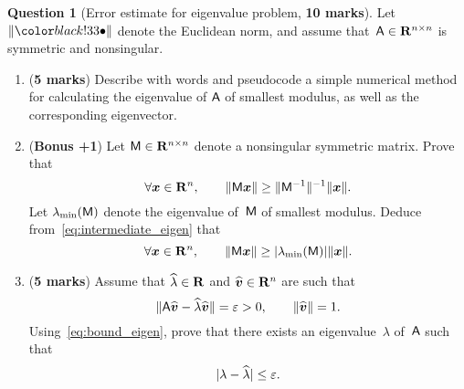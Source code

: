 \documentclass[11pt]{article}
\theoremstyle{definition}
\newtheorem{question}{Question}
\begin{document}


\newpage
\begin{question}
    [Error estimate for eigenvalue problem, \textbf{10 marks}]
    Let $\norm{\placeholder}$ denote the Euclidean norm,
    and assume that~$\mathsf A \in \mathbf R^{n \times n}$ is symmetric and nonsingular.

    \begin{enumerate}
        \item
            (\textbf{5 marks})
            Describe with words and pseudocode a simple numerical method for calculating the eigenvalue of $\mathsf A$ of smallest modulus,
            as well as the corresponding eigenvector.

        \item
            (\textbf{Bonus +1})
            Let $\mathsf M \in \mathbf R^{n \times n}$ denote a nonsingular symmetric matrix.
            Prove that
            \begin{equation}
                \label{eq:intermediate_eigen}
                \forall \mathbf{\boldsymbol{x}} \in \mathbf R^n, \qquad
                \lVert\mathsf M \mathbf{\boldsymbol{x}}\rVert \geq \lVert\mathsf M^{-1}\rVert^{-1} \lVert\mathbf{\boldsymbol{x}}\rVert.
            \end{equation}
            Let $\lambda_{\min}(\mathsf M)$ denote the eigenvalue of~$\mathsf M$ of smallest modulus.
            Deduce from~\eqref{eq:intermediate_eigen} that
            \begin{equation}
                \label{eq:bound_eigen}
                \forall \mathbf{\boldsymbol{x}} \in \mathbf R^n, \qquad
                \lVert\mathsf M \mathbf{\boldsymbol{x}}\rVert \geq \lvert\lambda_{\min}(\mathsf M)\rvert \lVert\mathbf{\boldsymbol{x}}\rVert.
            \end{equation}

        \item
            (\textbf{5 marks})
            Assume that $\widehat \lambda \in \mathbf R$ and $\widehat{\mathbf{\boldsymbol{v}}} \in \mathbf R^n$ are such that
            \begin{equation}
                \label{eq:bound}
                \lVert\mathsf A \widehat{\mathbf{\boldsymbol{v}}} - \widehat{\lambda} \widehat{\mathbf{\boldsymbol{v}}}\rVert = \varepsilon > 0,
                \qquad \lVert\widehat {\mathbf{\boldsymbol{v}}}\rVert = 1.
            \end{equation}
            Using~\eqref{eq:bound_eigen},
            prove that there exists an eigenvalue~$\lambda$ of~$\mathsf A$ such that
            \[
                \lvert\lambda - \widehat \lambda\rvert \leq \varepsilon.
            \]


\end{enumerate}
\end{question}
\end{document}
